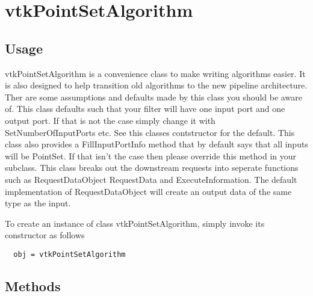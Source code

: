 \section{vtkPointSetAlgorithm}

\subsection{Usage}

 vtkPointSetAlgorithm is a convenience class to make writing algorithms
 easier. It is also designed to help transition old algorithms to the new
 pipeline architecture. Ther are some assumptions and defaults made by this
 class you should be aware of. This class defaults such that your filter
 will have one input port and one output port. If that is not the case
 simply change it with SetNumberOfInputPorts etc. See this classes
 contstructor for the default. This class also provides a FillInputPortInfo
 method that by default says that all inputs will be PointSet. If that
 isn't the case then please override this method in your subclass. This
 class breaks out the downstream requests into seperate functions such as
 RequestDataObject RequestData and ExecuteInformation. The default 
 implementation of RequestDataObject will create an output data of the 
 same type as the input. 

To create an instance of class vtkPointSetAlgorithm, simply
invoke its constructor as follows
\begin{verbatim}
  obj = vtkPointSetAlgorithm
\end{verbatim}
\subsection{Methods}

